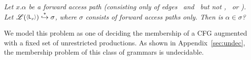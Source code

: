 \documentclass[9pt,nonatbib]{sigplanconf}
\newcommand{\added}[1]{#1}
\begin{document}
{\em
Let $x.\alpha$ be a forward access path (consisting only
of edges  \acar\ and \acdr\  but not \bcar,  \bcdr\ or
\clazy).       Let      $\mathscr{L}(\var{\Lanv{x}{}})
\stackrel{*}{\hookrightarrow}  \sigma$, where  $\sigma$
consists  of  forward  access  paths  only.  \added{Then  is
$\alpha \in \sigma$?}
}

We model this problem as one of deciding the membership of a CFG
augmented with a fixed set of unrestricted productions. As shown in
Appendix~\ref{sec:undec}, the membership problem of this class of
grammars is undecidable.







\end{document}
